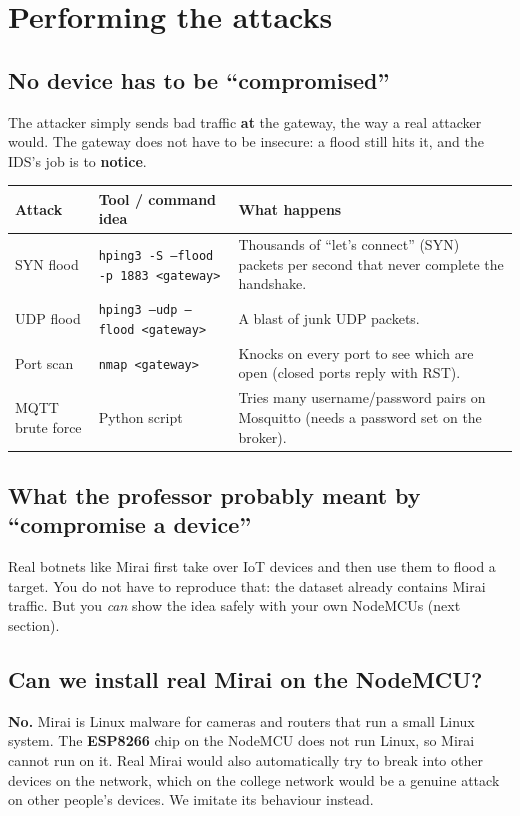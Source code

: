 \documentclass[11pt]{article}
\begin{document}
\section{Performing the attacks}

\subsection*{No device has to be ``compromised''}
The attacker simply sends bad traffic \textbf{at} the gateway, the way a real attacker would.
The gateway does not have to be insecure: a flood still hits it, and the IDS's job is to \textbf{notice}.

\begin{longtable}{@{}>{\raggedright}p{3.2cm} >{\raggedright}p{3.8cm} >{\raggedright\arraybackslash}p{8.8cm}@{}}
\toprule
\textbf{Attack} & \textbf{Tool / command idea} & \textbf{What happens} \\
\midrule
\endhead
SYN flood & \texttt{hping3 -S --flood -p 1883 <gateway>} & Thousands of ``let's connect'' (SYN) packets per second that never complete the handshake. \\
UDP flood & \texttt{hping3 --udp --flood <gateway>} & A blast of junk UDP packets. \\
Port scan & \texttt{nmap <gateway>} & Knocks on every port to see which are open (closed ports reply with RST). \\
MQTT brute force & Python script & Tries many username/password pairs on Mosquitto (needs a password set on the broker). \\
\bottomrule
\end{longtable}

\subsection*{What the professor probably meant by ``compromise a device''}
Real botnets like Mirai first take over IoT devices and then use them to flood a target. You do not have to reproduce that:
the dataset already contains Mirai traffic. But you \emph{can} show the idea safely with your own NodeMCUs (next section).

\subsection*{Can we install real Mirai on the NodeMCU?}
\textbf{No.} Mirai is Linux malware for cameras and routers that run a small Linux system. The \textbf{ESP8266} chip on the NodeMCU
does not run Linux, so Mirai cannot run on it. Real Mirai would also automatically try to break into other devices on the network,
which on the college network would be a genuine attack on other people's devices. We imitate its behaviour instead.
\end{document}
